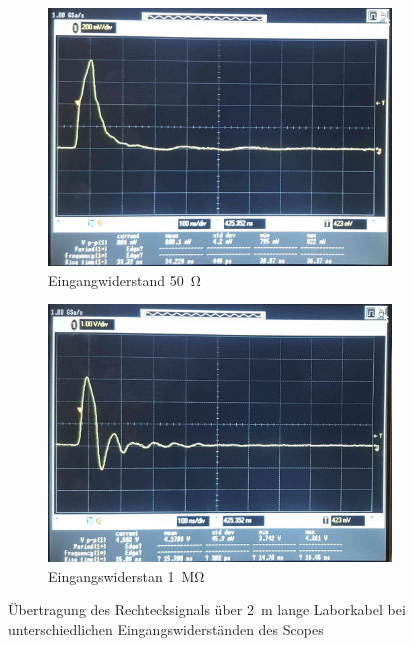 \documentclass[a4paper,twoside,final]{article}
\begin{document}
\begin{figure}[htp]
    \centering
    \begin{subfigure}{0.45\textwidth}
        \includegraphics[width=\textwidth]{Bilder/Bild9.jpg}
        \caption{Eingangwiderstand \SI{50}{\ohm}}
    \end{subfigure}\hspace{1cm}
    \begin{subfigure}{0.45\textwidth}
        \includegraphics[width=\textwidth]{Bilder/Bild10.jpg}
        \caption{Eingangswiderstan \SI{1}{\mega\ohm}}
    \end{subfigure}
    \caption{Übertragung des Rechtecksignals über \SI{2}{\metre} lange Laborkabel bei unterschiedlichen Eingangswiderständen des Scopes}
\end{figure}
\end{document}
